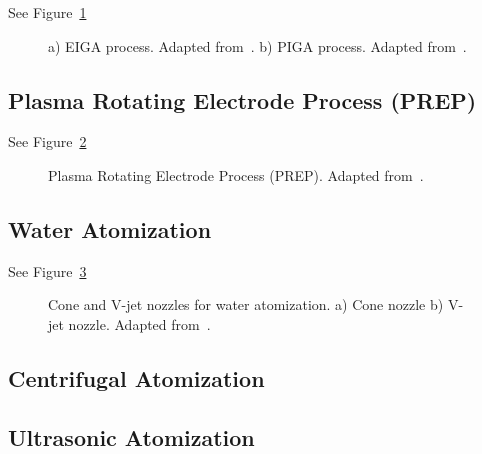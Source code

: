 \documentclass[final,5p,times,twocolumn]{elsarticle}
\begin{document}
See Figure~\ref{f:eiga_piga}

\begin{figure}
    \centering
        
        \caption[EIGA and PIGA processes]{a) EIGA process. Adapted from~\cite{Spitans2020NumericalModeling}. b) PIGA process. Adapted from~\cite{Sun2017ReviewMethods,Chen2018ComparativeStudy}.}
        \label{f:eiga_piga}
\end{figure}

\subsection{Plasma Rotating Electrode Process (PREP)}
\label{s:PREP}

See Figure~\ref{f:prep}

\begin{figure}
    \centering
        
        \caption[Plasma Rotating Electrode Process (PREP)]{Plasma Rotating Electrode Process (PREP). Adapted from~\cite{Chen2018ComparativeStudy, Zhao2020CentrifugalGranulation,Wu2025ReviewMetal}.}
        \label{f:prep}
\end{figure}

\subsection{Water Atomization}
\label{s:Water_Atomization}

See Figure~\ref{f:water_nozzle}


\begin{figure}
    \centering
        
        \caption[Cone and V-jet nozzles for water atomization.]{Cone and V-jet nozzles for water atomization. a) Cone nozzle b) V-jet nozzle. Adapted from~\cite{Seki1990EffectAtomization, Neikov2009HandbookNonFerrous}.}
        \label{f:water_nozzle}
\end{figure}

\subsection{Centrifugal Atomization}
\label{s:Centrifugal_Atomization}

\subsection{Ultrasonic Atomization}
\label{s:Ultrasonic_Atomization}
\end{document}
